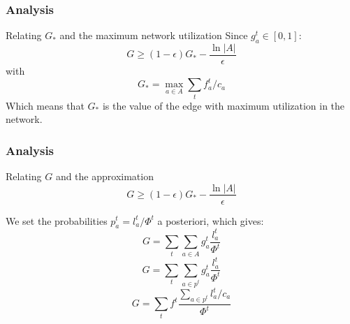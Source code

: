 \documentclass{beamer}
\begin{document}
\begin{frame}
    \frametitle{Analysis}

    \begin{block}{Relating $G_*$ and the maximum network utilization}
        Since $g_a^t \in [0,1]$:
        \begin{equation*}
            G \geq (1 - \epsilon) G_* - \dfrac{\ln |A|}{\epsilon}
        \end{equation*}
        with
        \begin{equation*}
            G_* = \max_{a\in A} \sum_t f^t_a / c_a
        \end{equation*}
        Which means that $G_*$ is the value of the edge with maximum
        utilization in the network.
    \end{block}

\end{frame}

\begin{frame}
    \frametitle{Analysis}

    \begin{block}{Relating $G$ and the approximation}
        \begin{equation*}
            G \geq (1 - \epsilon) G_* - \dfrac{\ln |A|}{\epsilon}
        \end{equation*}
        
        We set the probabilities $p_a^t = l_a^t / \Phi^t$ a posteriori, which
        gives:
        \begin{equation*}
            G = \sum_t \sum_{a\in A} g_a^t \frac{l_a^t}{\Phi^t}
        \end{equation*}
        \begin{equation*}
            G = \sum_t \sum_{a\in p^t} g_a^t \frac{l_a^t}{\Phi^t}
        \end{equation*}
        \begin{equation*}
            G = \sum_t f^t \frac{\sum_{a\in p^t} l_a^t / c_a}{\Phi^t}
        \end{equation*}
    \end{block}

\end{frame}
\end{document}
